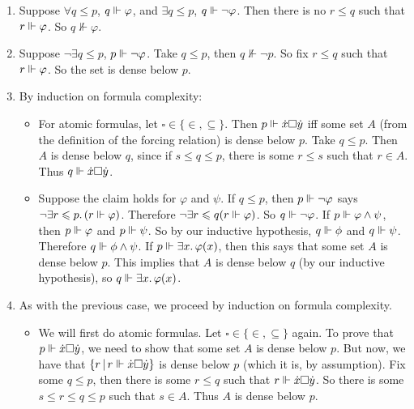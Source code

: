 \documentclass{article}
\begin{document}
    \begin{enumerate}
        \item[(ii) $\Rightarrow$ (iii)] Suppose $\forall q \leq p$, $q \Vdash \varphi$, and $\exists q \leq p$, $q \Vdash \neg \varphi$. Then there is no $r \leq q$ such that $r \Vdash \varphi$. So $q \nVdash \varphi$.
        \item[(iii) $\Rightarrow$ (iv)] Suppose $\neg \exists q \leq p$, $p \Vdash \neg \varphi$. Take $q \leq p$, then $q \nVdash \neg p$. So fix $r \leq q$ such that $r \Vdash \varphi$. So the set is dense below $p$.
        \item[(i) $\Rightarrow$ (ii)] By induction on formula complexity: \gap \begin{itemize}
                  \item For atomic formulas, let $\square \in \{ \in, \subseteq \}$. Then $p \Vdash \dot{x} \square \dot{y}$ iff some set $A$ (from the definition of the forcing relation) is dense below $p$. Take $q \leq p$. Then $A$ is dense below $q$, since if $s \leq q \leq p$, there is some $r \leq s$ such that $r \in A$. Thus $q \Vdash \dot{x} \square \dot{y}$.
                  \item Suppose the claim holds for $\varphi$ and $\psi$. \gap
                        If $q \leq p$, then $p \Vdash \neg \varphi$ says $\neg \exists r \leqslant p. \, (r \Vdash \varphi)$. Therefore $\neg \exists r \leqslant q (r \Vdash \varphi)$. So $q \Vdash \neg \varphi$.\gap
                        If $p \Vdash \varphi \wedge \psi$, then $p \Vdash \varphi$ and $p \Vdash \psi$. So by our inductive hypothesis, $q \Vdash \phi$ and $q \Vdash \psi$. Therefore $q \Vdash \phi \wedge \psi$.\gap
                        If $p \Vdash \exists x. \, \varphi(x)$, then this says that some set $A$ is dense below $p$. This implies that $A$ is dense below $q$ (by our inductive hypothesis), so $q \Vdash \exists x. \, \varphi(x)$.
              \end{itemize}
        \item[(iv) $\Rightarrow$ (i)] As with the previous case, we proceed by induction on formula complexity. \begin{itemize}
                  \item We will first do atomic formulas. Let $\square \in \{\in, \subseteq\}$ again. To prove that $p \Vdash \dot{x} \square \dot{y}$, we need to show that some set $A$ is dense below $p$. But now, we have that $\{ r \, | \, r \Vdash \dot{x} \square \dot{y}\}$ is dense below $p$ (which it is, by assumption). Fix some $q \leq p$, then there is some $r \leq q$ such that $r \Vdash \dot{x} \square \dot{y}$. So there is some $s \leq r \leq q \leq p$ such that $s \in A$. Thus $A$ is dense below $p$.

\end{itemize}
\end{enumerate}
\end{document}
